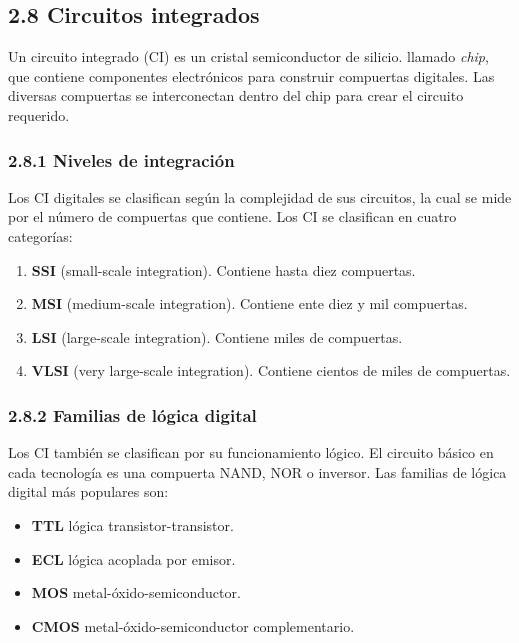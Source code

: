 \subsection*{2.8 Circuitos integrados}
Un circuito integrado (CI) es un cristal semiconductor de silicio. llamado \textit{chip},
que contiene componentes electr\'{o}nicos para construir compuertas digitales.
Las diversas compuertas se interconectan dentro del chip para crear el circuito requerido.

\subsubsection*{2.8.1 Niveles de integraci\'{o}n}
Los CI digitales se clasifican seg\'{u}n la complejidad de sus circuitos, la cual se mide
por el n\'{u}mero de compuertas que contiene. Los CI se clasifican en cuatro categor\'{i}as:

\begin{enumerate}
    \item
          \textbf{SSI} (small-scale integration).
          Contiene hasta diez compuertas.
    \item
          \textbf{MSI} (medium-scale integration).
          Contiene ente diez y mil compuertas.
    \item
          \textbf{LSI} (large-scale integration).
          Contiene miles de compuertas.
    \item
          \textbf{VLSI} (very large-scale integration).
          Contiene cientos de miles de compuertas.
\end{enumerate}

\subsubsection*{2.8.2 Familias de l\'{o}gica digital}
Los CI tambi\'{e}n se clasifican por su funcionamiento l\'{o}gico. El circuito b\'{a}sico
en cada tecnolog\'{i}a es una compuerta NAND, NOR o inversor. Las familias de l\'{o}gica
digital m\'{a}s populares son:

\begin{itemize}
    \item
          \textbf{TTL} l\'{o}gica transistor-transistor.
    \item
          \textbf{ECL} l\'{o}gica acoplada por emisor.
    \item
          \textbf{MOS} metal-\'{o}xido-semiconductor.
    \item
          \textbf{CMOS} metal-\'{o}xido-semiconductor  complementario.
\end{itemize}

